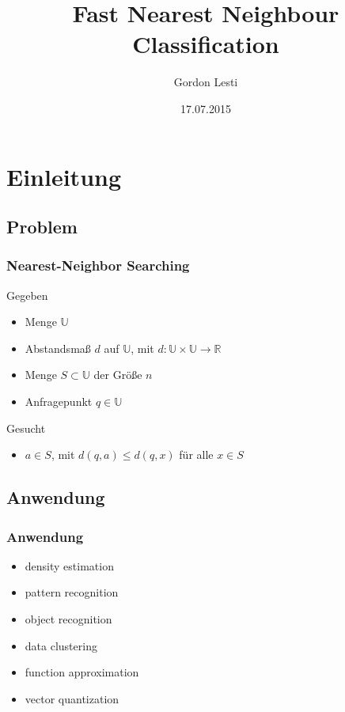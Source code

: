 \documentclass{beamer}
\begin{document}
\title{Fast Nearest Neighbour Classification}
\author{Gordon Lesti}
\date{17.07.2015}

\frame{\titlepage}

\section{Einleitung}

\subsection{Problem}
\begin{frame}
 \frametitle{Nearest-Neighbor Searching}
 \begin{block}{Gegeben}
   \begin{itemize}
    \item Menge $\mathbb{U}$
    \pause
    \item Abstandsmaß $d$ auf $\mathbb{U}$, mit $d: \mathbb{U} \times \mathbb{U} \to \mathbb{R}$
    \pause
    \item Menge $S \subset \mathbb{U}$ der Größe $n$
    \pause
    \item Anfragepunkt $q \in \mathbb{U}$
  \end{itemize}
 \end{block}
 \pause
 \begin{block}{Gesucht}
    \begin{itemize}
     \item $a \in S$, mit $d(q, a) \le d(q, x)$ f\"ur alle $x \in S$
    \end{itemize}
 \end{block}
\end{frame}

\subsection{Anwendung}
\begin{frame}
 \frametitle{Anwendung}
 \begin{itemize}
 \item density estimation
 \item pattern recognition
 \item object recognition
 \item data clustering
 \item function approximation
 \item vector quantization
\end{itemize}
\end{frame}
\end{document}
